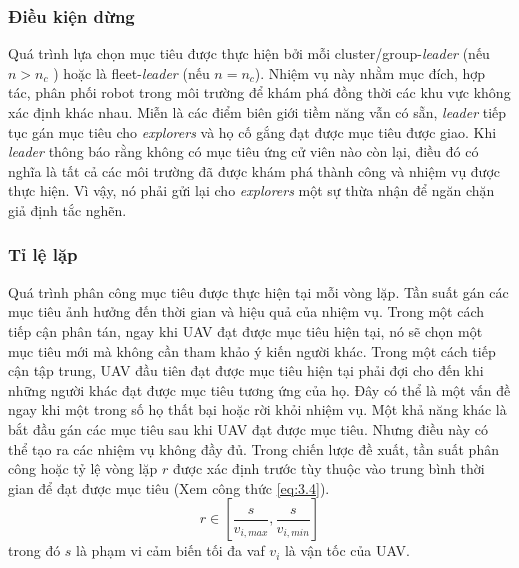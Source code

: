 \documentclass[11pt,openany]{book}
\begin{document}
\subsubsection{Điều kiện dừng}
Quá trình lựa chọn mục tiêu được thực hiện bởi mỗi cluster/group-\textit{leader} (nếu $n>n_c$ ) hoặc là fleet-\textit{leader} (nếu $n=n_c$). Nhiệm vụ này nhằm mục đích, hợp tác, phân phối robot trong môi trường để khám phá đồng thời các khu vực không xác định khác nhau. Miễn là các điểm biên giới tiềm năng vẫn có sẵn, \textit{leader} tiếp tục gán mục tiêu cho \textit{explorers} và họ cố gắng đạt được mục tiêu được giao. Khi \textit{leader} thông báo rằng không có mục tiêu ứng cử viên nào còn lại, điều đó có nghĩa là tất cả các môi trường đã được khám phá thành công và nhiệm vụ được thực hiện. Vì vậy, nó phải gửi lại cho \textit{explorers} một sự thừa nhận để ngăn chặn giả định tắc nghẽn.
\subsubsection{Tỉ lệ lặp}
Quá trình phân công mục tiêu được thực hiện tại mỗi vòng lặp. Tần suất gán các mục tiêu ảnh hưởng đến thời gian và hiệu quả của nhiệm vụ. Trong một cách tiếp cận phân tán, ngay khi UAV đạt được mục tiêu hiện tại, nó sẽ chọn một mục tiêu mới mà không cần tham khảo ý kiến người khác. Trong một cách tiếp cận tập trung, UAV đầu tiên đạt được mục tiêu hiện tại phải đợi cho đến khi những người khác đạt được mục tiêu tương ứng của họ. Đây có thể là một vấn đề ngay khi một trong số họ thất bại hoặc rời khỏi nhiệm vụ. Một khả năng khác là bắt đầu gán các mục tiêu sau khi UAV đạt được mục tiêu. Nhưng điều này có thể tạo ra các nhiệm vụ không đầy đủ. Trong chiến lược đề xuất, tần suất phân công hoặc tỷ lệ vòng lặp $r$ được xác định trước tùy thuộc vào trung bình thời gian để đạt được mục tiêu (Xem công thức \ref{eq:3.4}).
\begin{equation} \label{eq:3.4}
    r \in [\frac{s}{v_{i,max}},\frac{s}{v_{i,min}}]
\end{equation}
trong đó $s$ là phạm vi cảm biến tối đa vaf $v_i$ là vận tốc của UAV.
\end{document}
